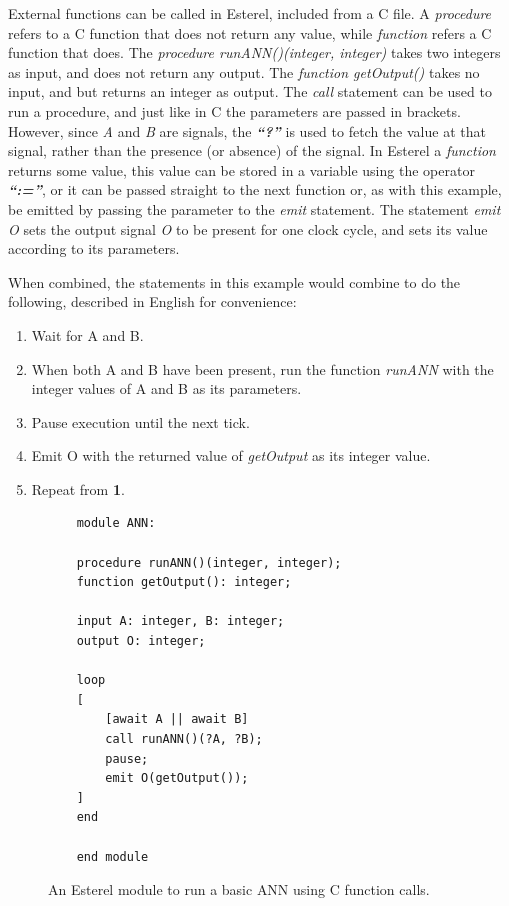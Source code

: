 External functions can be called in Esterel, included from a C file.
A \textit{procedure} refers to a C function that does not return any value, while \textit{function} refers a C function that does.
The \textit{procedure runANN()(integer, integer)} takes two integers as input, and does not return any output.
The \textit{function getOutput()} takes no input, and but returns an integer as output.
The \textit{call} statement can be used to run a procedure, and just like in C the parameters are passed in brackets.
However, since \textit{A} and \textit{B} are signals, the \textbf{\emph{``?''}} is used to fetch the value at that signal, rather than the presence (or absence) of the signal.
In Esterel a \textit{function} returns some value, this value can be stored in a variable using the operator \textbf{\emph{``:=''}}, or it can be passed straight to the next function or, as with this example, be emitted by passing the parameter to the \textit{emit} statement.
The statement \textit{emit O} sets the output signal \textit{O} to be present for one clock cycle, and sets its value according to its parameters.

When combined, the statements in this example would combine to do the following, described in English for convenience:
\begin{enumerate}
	\item Wait for A and B. 
	\item When both A and B have been present, run the function \textit{runANN} with the integer values of A and B as its parameters.
	\item Pause execution until the next tick.
	\item Emit O with the returned value of \textit{getOutput} as its integer value.
	\item Repeat from \textbf{1}.
\end{enumerate}

\begin{figure}[h]
	\begin{lstlisting}
	module ANN:
	
	procedure runANN()(integer, integer);
	function getOutput(): integer;
	
	input A: integer, B: integer;
	output O: integer;
	
	loop
	[
		[await A || await B] 
		call runANN()(?A, ?B);
		pause;
		emit O(getOutput());
	]
	end
	
	end module
	\end{lstlisting}
	\caption{An Esterel module to run a basic \ac{ANN} using C function calls.}
	\label{fig:esterel-abro}
\end{figure}

